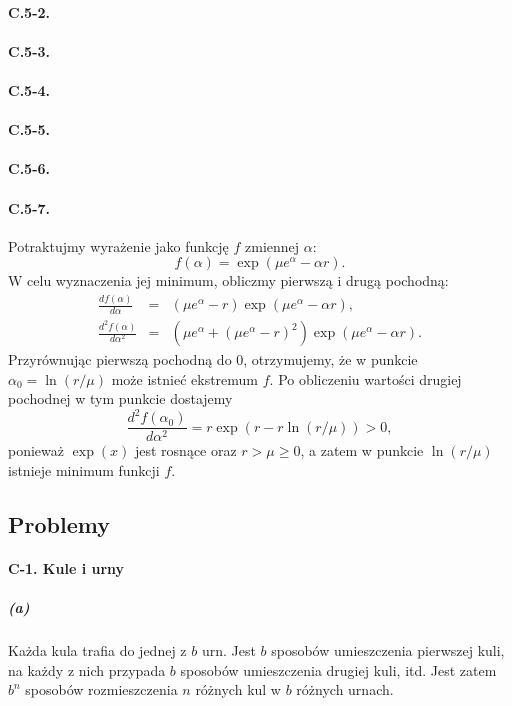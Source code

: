 \paragraph{C.5-2.}
\paragraph{C.5-3.}
\paragraph{C.5-4.}
\paragraph{C.5-5.}
\paragraph{C.5-6.}
\paragraph{C.5-7.}
Potraktujmy wyrażenie jako funkcję $f$ zmiennej $\alpha$:
\[
	f(\alpha) = \exp(\mu e^\alpha-\alpha r).
\]
W celu wyznaczenia jej minimum, obliczmy pierwszą i drugą pochodną:
\begin{eqnarray*}
	\frac{df(\alpha)}{d\alpha} &=& (\mu e^\alpha-r)\exp(\mu e^\alpha-\alpha r), \\
	\frac{d^2f(\alpha)}{d\alpha^2} &=& \left(\mu e^\alpha+(\mu e^\alpha-r)^2\right)\exp(\mu e^\alpha-\alpha r).
\end{eqnarray*}
Przyrównując pierwszą pochodną do $0$, otrzymujemy, że w punkcie $\alpha_0=\ln(r/\mu)$ może istnieć ekstremum $f$. Po obliczeniu wartości drugiej pochodnej w tym punkcie dostajemy
\[
	\frac{d^2f(\alpha_0)}{d\alpha^2} = r\exp(r-r\ln(r/\mu))>0,
\]
ponieważ $\exp(x)$ jest rosnące oraz $r>\mu\ge 0$, a zatem w punkcie $\ln(r/\mu)$ istnieje minimum funkcji $f$.

\subsection*{Problemy}

\paragraph{C-1. Kule i urny}

\subparagraph{(a)}
Każda kula trafia do jednej z $b$ urn. Jest $b$ sposobów umieszczenia pierwszej kuli, na każdy z nich przypada $b$ sposobów umieszczenia drugiej kuli, itd. Jest zatem $b^n$ sposobów rozmieszczenia $n$ różnych kul w $b$ różnych urnach.

